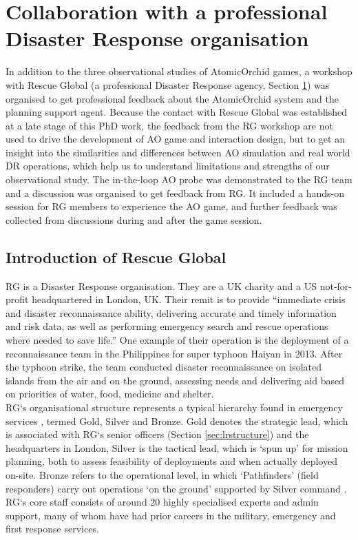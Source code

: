 \section{Collaboration with a professional Disaster Response organisation}\label{sec:rg}
In addition to the three observational studies of AtomicOrchid games, a workshop with Rescue Global (a professional Disaster Response agency, Section \ref{sec:rg}) was organised to get professional feedback about the AtomicOrchid system and the planning support agent. Because the contact with Rescue Global was established at a late stage of this PhD work, the feedback from the \ac{RG} workshop are not used to drive the development of \ac{AO} game and interaction design, but to get an insight into the similarities and differences between \ac{AO} simulation and real world \ac{DR} operations, which help us to understand limitations and strengths of our observational study. The in-the-loop \ac{AO} probe was demonstrated to the \ac{RG} team and a discussion was organised to get feedback from \ac{RG}. It included a hands-on session for \ac{RG} members to experience the \ac{AO} game, and further feedback was collected from discussions during and after the game session.\\

\subsection{Introduction of Rescue Global}
\acf{RG} is a Disaster Response organisation. They are a UK charity and a US not-for-profit headquartered in London, UK. Their remit is to provide ``immediate crisis and disaster reconnaissance ability, delivering accurate and timely information and risk data, as well as performing emergency search and rescue operations where needed to save life.'' One example of their operation is the deployment of a reconnaissance team in the Philippines for super typhoon Haiyan in 2013. After the typhoon strike, the team conducted disaster reconnaissance on isolated islands from the air and on the ground, assessing needs and delivering aid based on priorities of water, food, medicine and shelter.\\

\ac{RG}`s organisational structure represents a typical hierarchy found in emergency services \citep{U.S.DepartmentofHomelandSecurity2008}, termed Gold, Silver and Bronze. Gold denotes the strategic lead, which is associated with \ac{RG}`s senior officers (Section \ref{sec:lrstructure}) and the headquarters in London, Silver is the tactical lead, which is `spun up' for mission planning, both to assess feasibility of deployments and when actually deployed on-site. Bronze refers to the operational level, in which `Pathfinders' (field responders) carry out operations `on the ground' supported by Silver command \citep{RescueGlobal2012}. \ac{RG}`s core staff consists of around 20 highly specialised experts and admin support, many of whom have had prior careers in the military, emergency and first response services.\\

